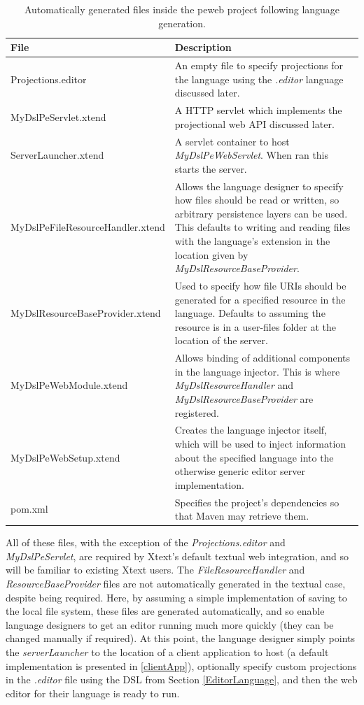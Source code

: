 \documentclass{article}
\begin{document}
\begin{table}[h!]
\centering
\begin{tabular}{| m{7cm} | m{8cm} |}
\hline
File & Description \\
\hline \hline
Projections.editor & An empty file to specify projections for the language using the \emph{.editor} language discussed later.\\
\hline
MyDslPeServlet.xtend & A HTTP servlet which implements the projectional web API discussed later.\\
\hline
ServerLauncher.xtend & A servlet container to host \emph{MyDslPeWebServlet}. When ran this starts the server. \\
\hline
MyDslPeFileResourceHandler.xtend & Allows the language designer to specify how files should be read or written, so arbitrary persistence layers can be used. This defaults to writing and reading files with the language's extension in the location given by  \emph{MyDslResourceBaseProvider}. \\
\hline
MyDslResourceBaseProvider.xtend & Used to specify how file URIs should be generated for a specified resource in the language. Defaults to assuming the resource is in a user-files folder at the location of the server.\\
\hline
MyDslPeWebModule.xtend & Allows binding of additional components in the language injector. This is where \emph{MyDslResourceHandler} and \emph{MyDslResourceBaseProvider} are registered.\\
\hline
MyDslPeWebSetup.xtend & Creates the language injector itself, which will be used to inject information about the specified language into the otherwise generic editor server implementation.\\
\hline
pom.xml & Specifies the project's dependencies so that Maven may retrieve them.\\
\hline
\end{tabular}
\caption{Automatically generated files inside the peweb project following language generation.}
\label{Tab:generatedFiles}
\end{table}All of these files, with the exception of the \emph{Projections.editor} and \emph{MyDslPeServlet}, are required by Xtext's default textual web integration, and so will be familiar to existing Xtext users. The \emph{FileResourceHandler} and \emph{ResourceBaseProvider} files are not automatically generated in the textual case, despite being required. Here, by assuming a simple implementation of saving to the local file system, these files are generated automatically, and so enable language designers to get an editor running much more quickly (they can be changed manually if required). At this point, the language designer simply points the \emph{serverLauncher} to the location of a client application to host (a default implementation is presented in \ref{clientApp}), optionally specify custom projections in the \emph{.editor} file using the DSL from Section \ref{EditorLanguage}, and then the web editor for their language is ready to run.
\end{document}
